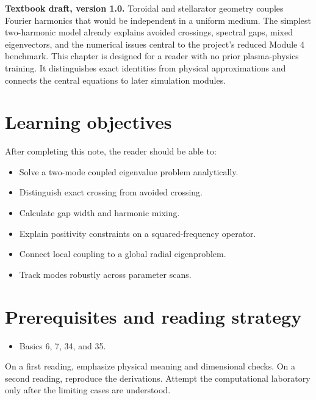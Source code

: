 \documentclass[11pt]{article}
\begin{document}

\begin{overviewbox}
\textbf{Textbook draft, version 1.0.} Toroidal and stellarator geometry couples Fourier harmonics that would be independent in a uniform medium. The simplest two-harmonic model already explains avoided crossings, spectral gaps, mixed eigenvectors, and the numerical issues central to the project's reduced Module 4 benchmark. This chapter is designed for a reader with no prior plasma-physics training. It distinguishes exact identities from physical approximations and connects the central equations to later simulation modules.
\end{overviewbox}

\ProjectTOC

\section{Learning objectives}
After completing this note, the reader should be able to:
\begin{itemize}[leftmargin=1.6em]
\item Solve a two-mode coupled eigenvalue problem analytically.
\item Distinguish exact crossing from avoided crossing.
\item Calculate gap width and harmonic mixing.
\item Explain positivity constraints on a squared-frequency operator.
\item Connect local coupling to a global radial eigenproblem.
\item Track modes robustly across parameter scans.
\end{itemize}

\section{Prerequisites and reading strategy}
\begin{itemize}[leftmargin=1.6em]
\item Basics 6, 7, 34, and 35.
\end{itemize}
On a first reading, emphasize physical meaning and dimensional checks. On a second reading, reproduce the derivations. Attempt the computational laboratory only after the limiting cases are understood.
\end{document}
